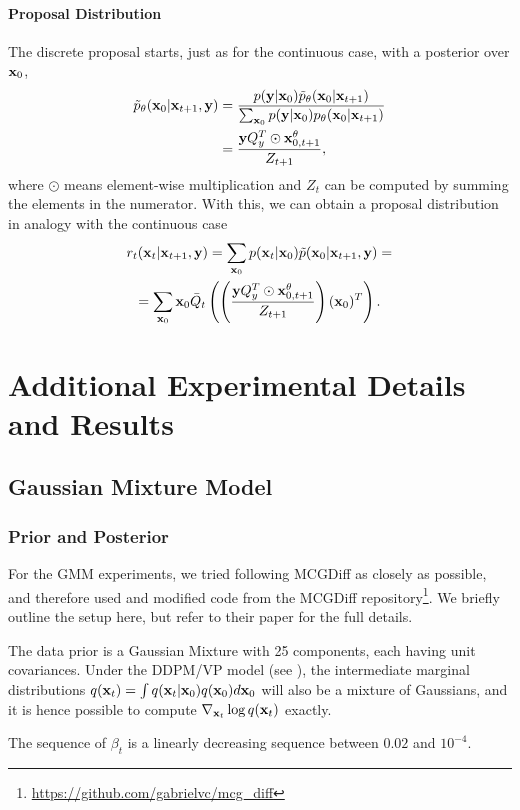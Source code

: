 \paragraph{Proposal Distribution}
The discrete proposal starts, just as for the continuous case, with a posterior over $\mathbf{x}_0$, 
\begin{align}
    \tilde p_\theta(\mathbf{x}_0|\mathbf{x}_{t+1}, \mathbf{y}) 
    &= \frac{p(\mathbf{y}|\mathbf{x}_0) \tilde p_\theta(\mathbf{x}_0|\mathbf{x}_{t+1})}{\sum_{\mathbf{x}_0} p(\mathbf{y}|\mathbf{x}_0) p_\theta(\mathbf{x}_0|\mathbf{x}_{t+1})}\\
    &= \frac{\mathbf{y} Q_y^T \odot \mathbf{x}_{0,t+1}^{\theta}}{Z_{t+1}},
\end{align}
where $\odot$ means element-wise multiplication and $Z_t$ can be computed by summing the elements in the numerator. With this, we can obtain a proposal distribution in analogy with the continuous case 
\begin{gather}
    r_t(\mathbf{x}_{t}|\mathbf{x}_{t+1}, \mathbf{y}) = \sum_{\mathbf{x}_0} p(\mathbf{x}_{t}|\mathbf{x}_0)\tilde p(\mathbf{x}_0|\mathbf{x}_{t+1}, \mathbf{y}) = \nonumber \\
    = \sum_{\mathbf{x}_0} \mathbf{x}_0 \bar Q_t \left(\left(\frac{\mathbf{y} Q_y^T \odot \mathbf{x}_{0, t+1}^{\theta}}{Z_{t+1}}\right)(\mathbf{x}_0)^T\right). \label{eq:discrete_proposal}
\end{gather}

\section{Additional Experimental Details and Results}
\subsection{Gaussian Mixture Model}
\label{app:gmm}
\subsubsection{Prior and Posterior}
For the GMM experiments, we tried following MCGDiff as closely as possible, and therefore used and modified code from the MCGDiff repository\footnote{\url{https://github.com/gabrielvc/mcg_diff}}. We briefly outline the setup here, but refer to their paper for the full details.

The data prior is a Gaussian Mixture with 25 components, each having unit covariances. Under the DDPM/VP model (see ), the intermediate marginal distributions $q(\mathbf{x}_{t}) = \int q(\mathbf{x}_{t}|\mathbf{x}_0)q(\mathbf{x}_0)d\mathbf{x}_0$ will also be a mixture of Gaussians, and it is hence possible to compute $\nabla_{\mathbf{x}_{t}}\log q(\mathbf{x}_{t})$ exactly. 

The sequence of $\beta_t$ is a linearly decreasing sequence between $0.02$ and $10^{-4}$.

